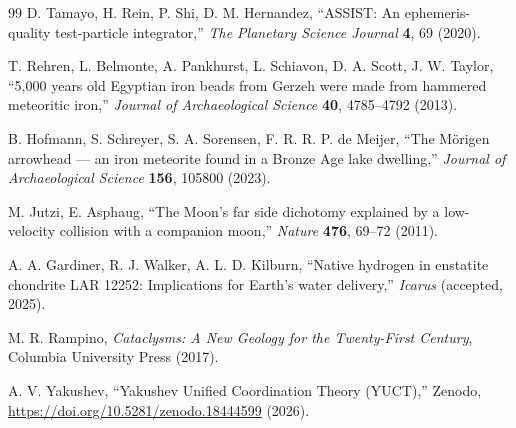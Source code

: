 \documentclass[11pt,a4paper]{article}
\begin{document}
\begin{thebibliography}{99}
		D. Tamayo, H. Rein, P. Shi, D. M. Hernandez, ``ASSIST: An ephemeris-quality test-particle integrator,''
		\emph{The Planetary Science Journal} \textbf{4}, 69 (2020).
		
		T. Rehren, L. Belmonte, A. Pankhurst, L. Schiavon, D. A. Scott, J. W. Taylor, ``5,000 years old Egyptian iron beads from Gerzeh were made from hammered meteoritic iron,''
		\emph{Journal of Archaeological Science} \textbf{40}, 4785–4792 (2013).
		
		B. Hofmann, S. Schreyer, S. A. Sorensen, F. R. R. P. de Meijer, ``The Mörigen arrowhead — an iron meteorite found in a Bronze Age lake dwelling,''
		\emph{Journal of Archaeological Science} \textbf{156}, 105800 (2023).
		
		M. Jutzi, E. Asphaug, ``The Moon's far side dichotomy explained by a low-velocity collision with a companion moon,''
		\emph{Nature} \textbf{476}, 69–72 (2011).
		
		A. A. Gardiner, R. J. Walker, A. L. D. Kilburn, ``Native hydrogen in enstatite chondrite LAR 12252: Implications for Earth's water delivery,''
		\emph{Icarus} (accepted, 2025).
		
		M. R. Rampino, \emph{Cataclysms: A New Geology for the Twenty-First Century},
		Columbia University Press (2017).
		
		A. V. Yakushev, ``Yakushev Unified Coordination Theory (YUCT),''
		Zenodo, \url{https://doi.org/10.5281/zenodo.18444599} (2026).
		

\end{thebibliography}
\end{document}
